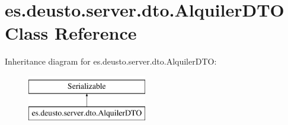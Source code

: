 \hypertarget{classes_1_1deusto_1_1server_1_1dto_1_1_alquiler_d_t_o}{}\section{es.\+deusto.\+server.\+dto.\+Alquiler\+D\+TO Class Reference}
\label{classes_1_1deusto_1_1server_1_1dto_1_1_alquiler_d_t_o}
Inheritance diagram for es.\+deusto.\+server.\+dto.\+Alquiler\+D\+TO\+:\begin{figure}[H]
\begin{center}
\leavevmode
\includegraphics[height=2.000000cm]{classes_1_1deusto_1_1server_1_1dto_1_1_alquiler_d_t_o}
\end{center}
\end{figure}
